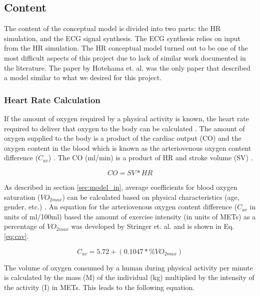 \documentclass[paper=a4, fontsize=11pt]{scrartcl}
\numberwithin{equation}{section}		%
\numberwithin{figure}{section}			%
\numberwithin{table}{section}		    %
\begin{document}
\subsection{Content} \label{sec:model_cont}
The content of the conceptual model is divided into two parts: the HR simulation, and the ECG
signal synthesis. The ECG synthesis relies on input from the HR simulation. The HR conceptual
model turned out to be one of the most difficult aspects of this project due to lack of 
similar work documented in the literature. The paper by Hotehama et. al.
\cite{hotehama2003simulation} was the only paper that described a model similar to what we
desired for this project.

\subsubsection{Heart Rate Calculation}\label{sec:model_cont_hr}
If the amount of oxygen required by a physical activity is known, the heart rate required to 
deliver that oxygen to the body can be calculated \cite{hotehama2003simulation}. The amount of 
oxygen supplied to the body is a product of the cardiac output (CO) and the oxygen content in the
blood which is known as the arteriovenous oxygen content difference ($C_{av}$)
\cite{hotehama2003simulation}. The CO (ml/min) is a product of HR and stroke volume (SV)
\cite{stringer1997cardiac}.

\begin{equation}\label{eq:co}
CO = SV * HR
\end{equation}

As described in section \ref{sec:model_in}, average coefficients for blood oxygen saturation 
($VO_{2max}$) can be calculated based on physical characteristics (age, gender, etc.) 
\cite{balady1995exercise}. An equation for the arteriovenous oxygen content difference ($C_{av}$ in 
units of ml/100ml) based the amount of exercise intensity (in units of METs) as a percentage of 
$VO_{2max}$ was developed by Stringer et. al. \cite{stringer1997cardiac} and is shown in Eq. 
\ref{eq:cav}.

\begin{equation}\label{eq:cav}
C_{av} = 5.72 + (0.1047 * \%VO_{2max}) 
\end{equation}

The volume of oxygen consumed by a human during physical activity per minute is calculated by the
mass (M) of the individual (kg) multiplied by the intensity of the activity (I) in METs. This leads
to the following equation.
\end{document}
